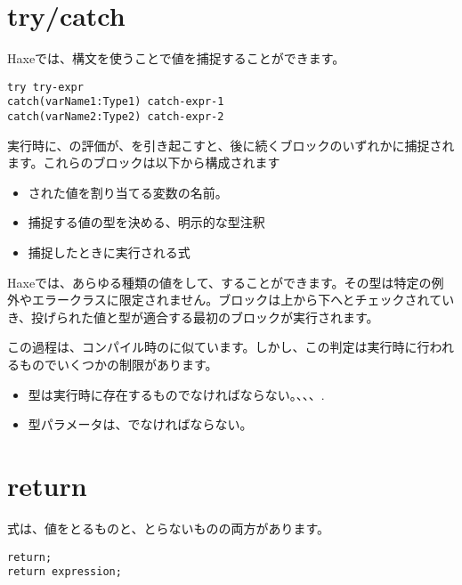 \section{try/catch}
\label{expression-try-catch}

Haxeでは、構文を使うことで値を捕捉することができます。

\begin{lstlisting}
try try-expr
catch(varName1:Type1) catch-expr-1
catch(varName2:Type2) catch-expr-2
\end{lstlisting}

実行時に、の評価が、を引き起こすと、後に続くブロックのいずれかに捕捉されます。これらのブロックは以下から構成されます

\begin{itemize}
	\item {}された値を割り当てる変数の名前。
	\item 捕捉する値の型を決める、明示的な型注釈
	\item 捕捉したときに実行される式
\end{itemize}

Haxeでは、あらゆる種類の値をして、することができます。その型は特定の例外やエラークラスに限定されません。ブロックは上から下へとチェックされていき、投げられた値と型が適合する最初のブロックが実行されます。

この過程は、コンパイル時のに似ています。しかし、この判定は実行時に行われるものでいくつかの制限があります。

\begin{itemize}
	\item 型は実行時に存在するものでなければならない。、、、.
	\item 型パラメータは、でなければならない。
\end{itemize}

\section{return}
\label{expression-return}

式は、値をとるものと、とらないものの両方があります。

\begin{lstlisting}
return;
return expression;
\end{lstlisting}

